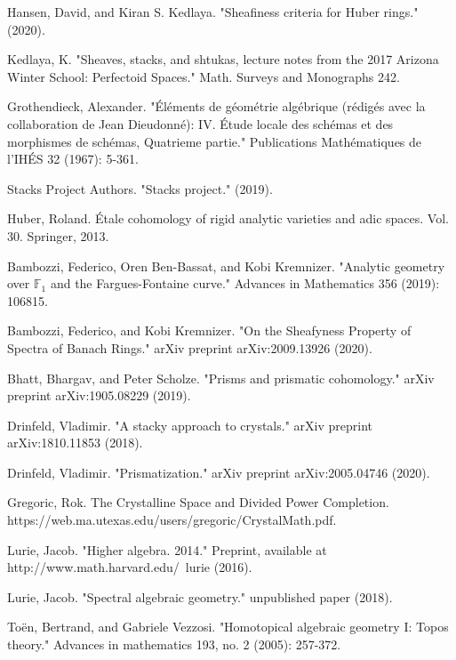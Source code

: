 \documentclass[12pt]{amsart}
\theoremstyle{definition}
\numberwithin{equation}{section}
\begin{document}

\begin{thebibliography}{10}
 Hansen, David, and Kiran S. Kedlaya. "Sheafiness criteria for Huber rings." (2020).

 Kedlaya, K. "Sheaves, stacks, and shtukas, lecture notes from the 2017 Arizona Winter School: Perfectoid Spaces." Math. Surveys and Monographs 242.

 Grothendieck, Alexander. "\'El\'ements de g\'eom\'etrie alg\'ebrique (r\'edig\'es avec la collaboration de Jean Dieudonn\'e): IV. \'Etude locale des sch\'emas et des morphismes de sch\'emas, Quatrieme partie." Publications Math\'ematiques de l'IH\'ES 32 (1967): 5-361.

 Stacks Project Authors. "Stacks project." (2019).

 Huber, Roland. \'Etale cohomology of rigid analytic varieties and adic spaces. Vol. 30. Springer, 2013.

 Bambozzi, Federico, Oren Ben-Bassat, and Kobi Kremnizer. "Analytic geometry over $\mathbb{F}_1$ and the Fargues-Fontaine curve." Advances in Mathematics 356 (2019): 106815.

 Bambozzi, Federico, and Kobi Kremnizer. "On the Sheafyness Property of Spectra of Banach Rings." arXiv preprint arXiv:2009.13926 (2020).


 Bhatt, Bhargav, and Peter Scholze. "Prisms and prismatic cohomology." arXiv preprint arXiv:1905.08229 (2019).


 Drinfeld, Vladimir. "A stacky approach to crystals." arXiv preprint arXiv:1810.11853 (2018).

 Drinfeld, Vladimir. "Prismatization." arXiv preprint arXiv:2005.04746 (2020).

 Gregoric, Rok. The Crystalline Space and Divided Power Completion. https://web.ma.utexas.edu/users/gregoric/CrystalMath.pdf. 

Lurie, Jacob. "Higher algebra. 2014." Preprint, available at http://www.math.harvard.edu/~lurie (2016). 

Lurie, Jacob. "Spectral algebraic geometry." unpublished paper (2018).

 To\"en, Bertrand, and Gabriele Vezzosi. "Homotopical algebraic geometry I: Topos theory." Advances in mathematics 193, no. 2 (2005): 257-372.


\end{thebibliography}
\end{document}
